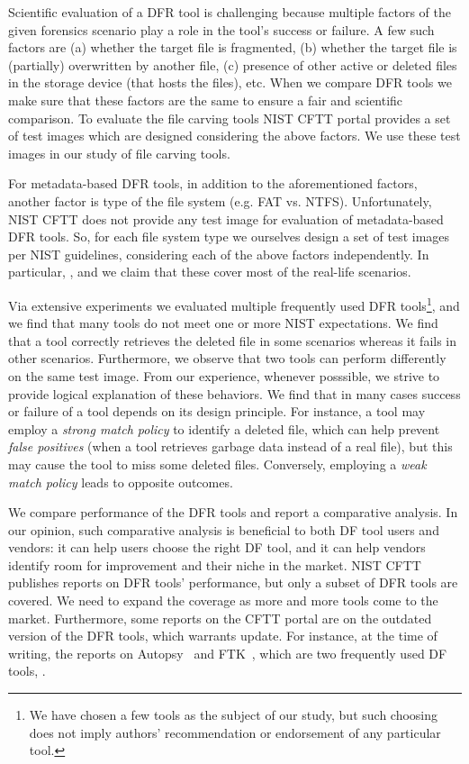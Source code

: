 Scientific evaluation of a DFR tool is challenging because multiple factors of the given forensics scenario play a role in the tool's success or failure.
A few such factors are (a) whether the target file is fragmented, (b) whether the target file is (partially) overwritten by another file, 
(c) presence of other active or deleted files in the storage device (that hosts the files), etc.
When we compare DFR tools we make sure that these factors are the same to ensure a fair and scientific comparison.
To evaluate the file carving tools NIST CFTT portal provides a set of test images which are designed considering the above factors.
We use these test images in our study of file carving tools. 

For metadata-based DFR tools, in addition to the aforementioned factors, another factor is type of the file system (e.g. FAT vs. NTFS). 
Unfortunately, NIST CFTT does not provide any test image for evaluation of metadata-based DFR tools.
So, for each file system type we ourselves design a set of test images per NIST guidelines, considering each of the above factors independently.
In particular, , and we claim that these cover most of the real-life scenarios.


Via extensive experiments we evaluated multiple frequently used DFR tools\footnote{We have chosen a few tools as the subject of our study, 
but such choosing does not imply authors' recommendation or endorsement of any particular tool.}, and we find that many tools do not meet one or more NIST expectations.
We find that a tool correctly retrieves the deleted file in some scenarios whereas it fails in other scenarios. Furthermore, we observe that 
two tools can perform differently on the same test image. From our experience, whenever posssible, 
we strive to provide logical explanation of these behaviors. We find that in many cases 
success or failure of a tool depends on its design principle. 
For instance, a tool may employ a \emph{strong match policy} to identify a deleted file, which can help prevent \emph{false positives} (when a tool retrieves garbage data instead of a real file),
but this may cause the tool to miss some deleted files. Conversely, employing a \emph{weak match policy} leads to opposite outcomes. 
 
We compare performance of the DFR tools and report a comparative analysis. In our opinion, such comparative analysis is beneficial to both DF tool 
users and vendors: it can help users choose the right DF tool, and it can help vendors identify room for improvement and their niche in the market. 
NIST CFTT publishes reports on DFR tools' performance, but only a subset of DFR tools are covered. 
We need to expand the coverage as more and more tools come to the market.
Furthermore, some reports on the CFTT portal are on the outdated version of the DFR tools, which warrants update. 
For instance, at the time of writing, the reports on Autopsy~\cite{dhs:autopsy} and FTK~\cite{dhs:ftk}, which are two frequently used DF tools, 
.   

